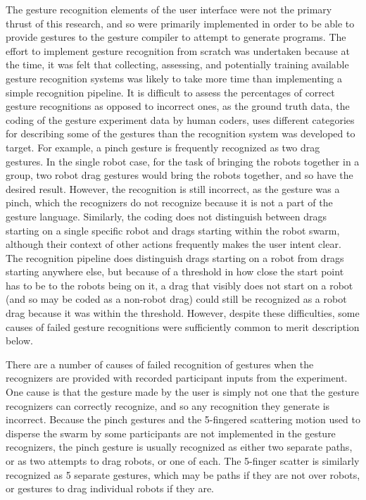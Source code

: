 The gesture recognition elements of the user interface were not the primary thrust of this research, and so were primarily implemented in order to be able to provide gestures to the gesture compiler to attempt to generate programs. 
The effort to implement gesture recognition from scratch was undertaken because at the time, it was felt that collecting, assessing, and potentially training available gesture recognition systems was likely to take more time than implementing a simple recognition pipeline. 
It is difficult to assess the percentages of correct gesture recognitions as opposed to incorrect ones, as the ground truth data, the coding of the gesture experiment data by human coders, uses different categories for describing some of the gestures than the recognition system was developed to target. 
For example, a pinch gesture is frequently recognized as two drag gestures. 
In the single robot case, for the task of bringing the robots together in a group, two robot drag gestures would bring the robots together, and so have the desired result. 
However, the recognition is still incorrect, as the gesture was a pinch, which the recognizers do not recognize because it is not a part of the gesture language. 
Similarly, the coding does not distinguish between drags starting on a single specific robot and drags starting within the robot swarm, although their context of other actions frequently makes the user intent clear. 
The recognition pipeline does distinguish drags starting on a robot from drags starting anywhere else, but because of a threshold in how close the start point has to be to the robots being on it, a drag that visibly does not start on a robot (and so may be coded as a non-robot drag) could still be recognized as a robot drag because it was within the threshold. 
However, despite these difficulties, some causes of failed gesture recognitions were sufficiently common to merit description below. 

There are a number of causes of failed recognition of gestures when the recognizers are provided with recorded participant inputs from the experiment. 
One cause is that the gesture made by the user is simply not one that the gesture recognizers can correctly recognize, and so any recognition they generate is incorrect. 
Because the pinch gestures and the 5-fingered scattering motion used to disperse the swarm by some participants are not implemented in the gesture recognizers, the pinch gesture is usually recognized as either two separate paths, or as two attempts to drag robots, or one of each. 
The 5-finger scatter is similarly recognized as 5 separate gestures, which may be paths if they are not over robots, or gestures to drag individual robots if they are. 


